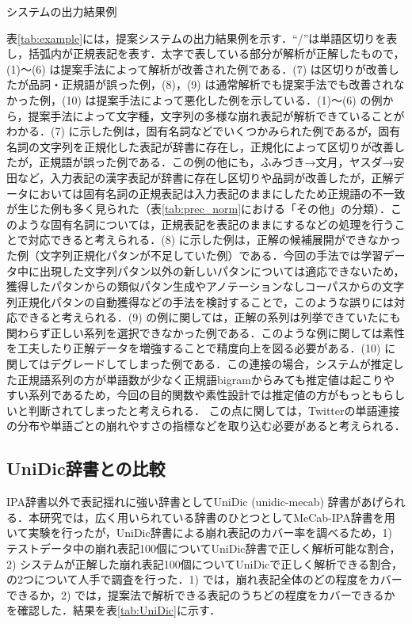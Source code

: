 \documentclass[japanese]{jnlp_1.4}
\begin{document}
\begin{table}[b]
\caption{システムの出力結果例}
\label{tab:example}

\end{table}

表\ref{tab:example}には，提案システムの出力結果例を示す．``/''は単語区切りを表し，括弧内が正規表記を表す．太字で表している部分が解析が正解したもので，(1)〜(6) は提案手法によって解析が改善された例である．(7) は区切りが改善したが品詞・正規語が誤った例，(8)，(9) は通常解析でも提案手法でも改善されなかった例，(10) は提案手法によって悪化した例を示している．(1)〜(6) の例から，提案手法によって文字種，文字列の多様な崩れ表記が解析できていることがわかる．(7) に示した例は，固有名詞などでいくつかみられた例であるが，固有名詞の文字列を正規化した表記が辞書に存在し，正規化によって区切りが改善したが，正規語が誤った例である．この例の他にも，ふみづき→文月，ヤスダ→安田など，入力表記の漢字表記が辞書に存在し区切りや品詞が改善したが，正解データにおいては固有名詞の正規表記は入力表記のままにしたため正規語の不一致が生じた例も多く見られた（表\ref{tab:prec_norm}における「その他」の分類）．このような固有名詞については，正規表記を表記のままにするなどの処理を行うことで対応できると考えられる．(8) に示した例は，正解の候補展開ができなかった例（文字列正規化パタンが不足していた例）である．今回の手法では学習データ中に出現した文字列パタン以外の新しいパタンについては適応できないため，獲得したパタンからの類似パタン生成やアノテーションなしコーパスからの文字列正規化パタンの自動獲得などの手法を検討することで，このような誤りには対応できると考えられる．(9) の例に関しては，正解の系列は列挙できていたにも関わらず正しい系列を選択できなかった例である．このような例に関しては素性を工夫したり正解データを増強することで精度向上を図る必要がある．(10) に関してはデグレードしてしまった例である．この連接の場合，システムが推定した正規語系列の方が単語数が少なく正規語bigramからみても推定値は起こりやすい系列であるため，今回の目的関数や素性設計では推定値の方がもっともらしいと判断されてしまったと考えられる．
この点に関しては，Twitterの単語連接の分布や単語ごとの崩れやすさの指標などを取り込む必要があると考えられる．


\subsection{UniDic辞書との比較}

IPA辞書以外で表記揺れに強い辞書としてUniDic (unidic-mecab) 辞書\cite{Unidic}があげられる．本研究では，広く用いられている辞書のひとつとしてMeCab-IPA辞書を用いて実験を行ったが，UniDic辞書による崩れ表記のカバー率を調べるため，1) テストデータ中の崩れ表記100個についてUniDic辞書で正しく解析可能な割合，2) システムが正解した崩れ表記100個についてUniDicで正しく解析できる割合，の2つについて人手で調査を行った．1) では，崩れ表記全体のどの程度をカバーできるか，2) では，提案法で解析できる表記のうちどの程度をカバーできるかを確認した．結果を表\ref{tab:UniDic}に示す．
\end{document}
